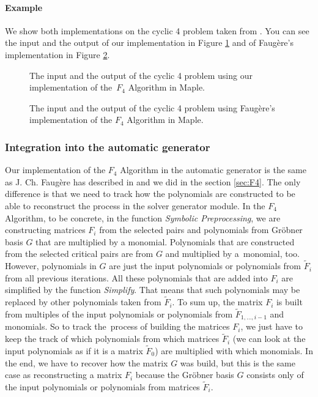 \paragraph{Example} We show both implementations on the cyclic 4 problem taken from \cite{F4}. You can see the input and the output of our implementation in Figure \ref{fig:F4:our} and of Faug\`ere's implementation in Figure \ref{fig:F4:Faug}.

\begin{figure}[!ht]
  \centering
  
  \caption{The input and the output of the cyclic 4 problem using our implementation of the~$F_4$ Algorithm in Maple.}
  \label{fig:F4:our}
\end{figure}

\begin{figure}[!ht]
  \centering
  
  \caption{The input and the output of the cyclic 4 problem using Faug\`ere's implementation of the $F_4$ Algorithm in Maple.}
  \label{fig:F4:Faug}
\end{figure}

\subsubsection{Integration into the automatic generator}
Our implementation of the $F_4$ Algorithm in the automatic generator is the same as J. Ch. Faug\`ere has described in \cite{F4} and we did in the section \ref{sec:F4}. The only difference is that we need to track how the polynomials are constructed to be able to reconstruct the process in the solver generator module. In the $F_4$ Algorithm, to be concrete, in the function \textit{Symbolic Preprocessing}, we are constructing matrices $F_i$ from the selected pairs and polynomials from Gr\"obner basis $G$ that are multiplied by a monomial. Polynomials that are constructed from the selected critical pairs are from $G$ and multiplied by a~monomial, too. However, polynomials in $G$ are just the input polynomials or polynomials from $\tilde{F}_i$ from all previous iterations. All these polynomials that are added into $F_i$ are simplified by the function \textit{Simplify}. That means that such polynomials may be replaced by other polynomials taken from $\tilde{F}_i$. To sum up, the matrix $F_i$ is built from multiples of the input polynomials or polynomials from $\tilde{F}_{1,\dots, i-1}$ and monomials. So to track the~process of building the matrices $F_i$, we just have to keep the track of which polynomials from which matrices $\tilde{F}_i$ (we can look at the input polynomials as if it is a matrix $\tilde{F}_0$) are multiplied with which monomials. In the end, we have to recover how the matrix $G$ was build, but this is the same case as reconstructing a matrix $F_i$ because the Gr\"obner basis $G$ consists only of the input polynomials or polynomials from matrices $\tilde{F}_i$.

